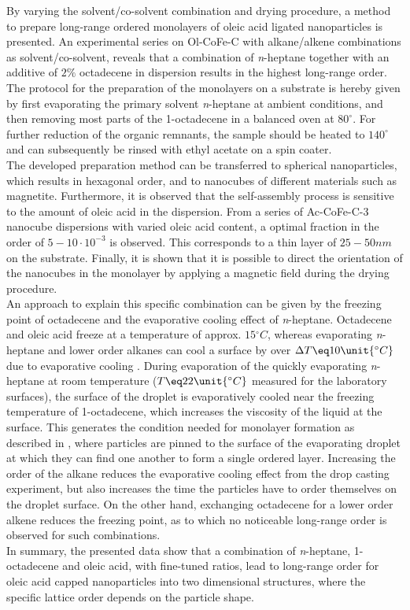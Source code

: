 \documentclass[\main/dresen_thesis.tex]{subfiles}
\begin{document}
  By varying the solvent/co-solvent combination and drying procedure, a method to prepare long-range ordered monolayers of oleic acid ligated nanoparticles is presented.
  An experimental series on Ol-CoFe-C with alkane/alkene combinations as solvent/co-solvent, reveals that a combination of \textit{n}-heptane together with an additive of $2 \%$ octadecene in dispersion results in the highest long-range order.
  The protocol for the preparation of the monolayers on a substrate is hereby given by first evaporating the primary solvent \textit{n}-heptane at ambient conditions, and then removing most parts of the 1-octadecene in a balanced oven at $80 ^\circ$.
  For further reduction of the organic remnants, the sample should be heated to $140 ^\circ$ and can subsequently be rinsed with ethyl acetate on a spin coater.
  \\

  The developed preparation method can be transferred to spherical nanoparticles, which results in hexagonal order, and to nanocubes of different materials such as magnetite.
  Furthermore, it is observed that the self-assembly process is sensitive to the amount of oleic acid in the dispersion.
  From a series of Ac-CoFe-C-3 nanocube dispersions with varied oleic acid content, a optimal fraction in the order of $5 - 10 \cdot 10^{-3}$ is observed.
  This corresponds to a thin layer of $25 - 50 \unit{nm}$ on the substrate.
  Finally, it is shown that it is possible to direct the orientation of the nanocubes in the monolayer by applying a magnetic field during the drying procedure.
  \\

  An approach to explain this specific combination can be given by the freezing point of octadecene and the evaporative cooling effect of \textit{n}-heptane.
  Octadecene and oleic acid freeze at a temperature of approx. $15 \unit{^\circ C}$, whereas evaporating \textit{n}-heptane and lower order alkanes can cool a surface by over $\Delta T \eq 10 \unit{^\circ C}$ due to evaporative cooling \cite{Tuckermann_2002_Evapo}.
  During evaporation of the quickly evaporating \textit{n}-heptane at room temperature ($T \eq 22 \unit{^\circ C}$ measured for the laboratory surfaces), the surface of the droplet is evaporatively cooled near the freezing temperature of 1-octadecene, which increases the viscosity of the liquid at the surface.
  This generates the condition needed for monolayer formation as described in \cite{Bigioni_2006_Kinet}, where particles are pinned to the surface of the evaporating droplet at which they can find one another to form a single ordered layer.
  Increasing the order of the alkane reduces the evaporative cooling effect from the drop casting experiment, but also increases the time the particles have to order themselves on the droplet surface.
  On the other hand, exchanging octadecene for a lower order alkene reduces the freezing point, as to which no noticeable long-range order is observed for such combinations.
  \\

  In summary, the presented data show that a combination of \textit{n}-heptane, 1-octadecene and oleic acid, with fine-tuned ratios, lead to long-range order for oleic acid capped nanoparticles into two dimensional structures, where the specific lattice order depends on the particle shape.
\end{document}
